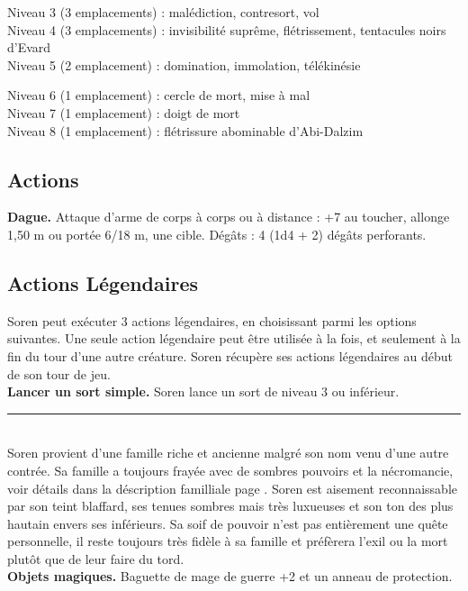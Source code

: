 \begin{figure*}[tb!]
{\begin{minipage}[c]{.45\linewidth}
Niveau 3 (3 emplacements) : malédiction, contresort, vol \\
Niveau 4 (3 emplacements) : invisibilité suprême, flétrissement, tentacules noirs d'Evard\\
Niveau 5 (2 emplacement) : domination, immolation, télékinésie
 \end{minipage}
  \hspace{4pt}
 \begin{minipage}[c]{.45\linewidth}
Niveau 6 (1 emplacement) : cercle de mort, mise à mal \\
Niveau 7 (1 emplacement) : doigt de mort \\
Niveau 8 (1 emplacement) : flétrissure abominable d'Abi-Dalzim
 \vspace{-10pt}
    \subsection*{Actions}
    {\bfseries Dague.} Attaque d'arme de corps à corps ou à distance : +7 au toucher, allonge 1,50 m ou portée 6/18 m,
         une cible. Dégâts : 4 (1d4 + 2) dégâts perforants.
 \vspace{-10pt}
    \subsection*{Actions Légendaires}
    Soren peut exécuter 3 actions légendaires, en choisissant parmi les options suivantes. Une seule action légendaire peut être utilisée à la fois, et seulement à la fin du tour d'une autre créature. Soren récupère ses actions légendaires au début de son tour de jeu. \\
    {\bfseries Lancer un sort simple.} Soren lance un sort de niveau 3 ou inférieur. \\
   \noindent\rule{\textwidth}{1pt} \\
 Soren provient d'une famille riche et ancienne malgré son nom venu d'une autre contrée. Sa famille a 
toujours frayée avec de sombres pouvoirs et la nécromancie, voir détails dans la déscription familliale
page \pageref{vanHjelmaster}. Soren est aisement reconnaissable par son teint blaffard, ses tenues sombres
mais très luxueuses et son ton des plus hautain envers ses inférieurs. Sa soif de pouvoir n'est pas 
entièrement une quête personnelle, il reste toujours très fidèle à sa famille et préfèrera l'exil ou la
mort plutôt que de leur faire du tord. \\
 {\bfseries Objets magiques.} Baguette de mage de guerre +2 et un anneau de protection.
 \end{minipage}
}%
\end{figure*}

